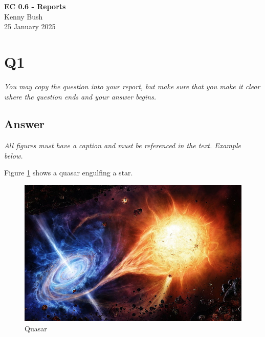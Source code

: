\documentclass[12pt]{article}
\begin{document}
\begin{centering}
{\large\textbf{EC 0.6 - Reports}}\\ 
Kenny Bush\\
25 January 2025\\
\end{centering}


\section*{Q1}

\emph{You may copy the question into your report, but make sure that you make it clear where the question ends and your answer begins.}

\subsection*{Answer}

\emph{All figures must have a caption and must be referenced in the text. Example below.}

Figure \ref{fig:quasar} shows a quasar engulfing a star.

\begin{figure}[h!]
    \centering
    \includegraphics[trim=0 20 10 50, clip, width=\textwidth] {quasar.jpg}
    \caption{Quasar}
    \label{fig:quasar}
\end{figure}
\end{document}

